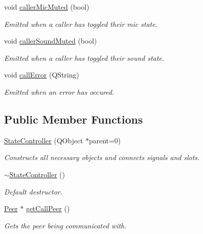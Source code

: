\begin{DoxyCompactItemize}
void \hyperlink{class_state_controller_af46adae585d21730cf1b8b34a2231e5f}{caller\-Mic\-Muted} (bool)
\begin{DoxyCompactList}\small\item\em \-Emitted when a caller has toggled their mic state. \end{DoxyCompactList}\item 
\hypertarget{class_state_controller_a00a1262e6c4c821bbdd04d11ea7c4910}{
void \hyperlink{class_state_controller_a00a1262e6c4c821bbdd04d11ea7c4910}{caller\-Sound\-Muted} (bool)}
\label{class_state_controller_a00a1262e6c4c821bbdd04d11ea7c4910}

\begin{DoxyCompactList}\small\item\em \-Emitted when a caller has toggled their sound state. \end{DoxyCompactList}\item 
void \hyperlink{class_state_controller_a3e16a340c75fec465358fee52bf57ec0}{call\-Error} (\-Q\-String)
\begin{DoxyCompactList}\small\item\em \-Emitted when an error has occured. \end{DoxyCompactList}\end{DoxyCompactItemize}
\subsection*{\-Public \-Member \-Functions}
\begin{DoxyCompactItemize}
\item 
\hyperlink{class_state_controller_af999000cc08456efccb2423a9173143f}{\-State\-Controller} (\-Q\-Object $\ast$parent=0)
\begin{DoxyCompactList}\small\item\em \-Constructs all necessary objects and connects signals and slots. \end{DoxyCompactList}\item 
\hypertarget{class_state_controller_af28a57ede7f1276025bebbaf400468f9}{
\hyperlink{class_state_controller_af28a57ede7f1276025bebbaf400468f9}{$\sim$\-State\-Controller} ()}
\label{class_state_controller_af28a57ede7f1276025bebbaf400468f9}

\begin{DoxyCompactList}\small\item\em \-Default destructor. \end{DoxyCompactList}\item 
\hyperlink{class_peer}{\-Peer} $\ast$ \hyperlink{class_state_controller_adadae117f434bc21cce75fa7e3e4d728}{get\-Call\-Peer} ()
\begin{DoxyCompactList}\small\item\em \-Gets the peer being communicated with. \end{DoxyCompactList}\end{DoxyCompactItemize}


